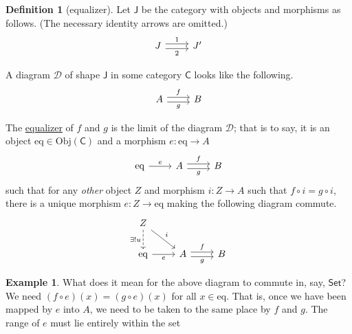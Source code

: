 \documentclass[a4paper,10pt]{scrreprt}
\newcommand{\defn}[1]{\ul{#1}}
\newcommand{\Obj}{\mathrm{Obj}}
\theoremstyle{definition}
\newtheorem{definition}{Definition}[section]
\newtheorem{example}{Example}[section]
\theoremstyle{plain}
\theoremstyle{remark}
\begin{document}
\begin{definition}[equalizer]
  \label{def:equalizer}
  Let $\mathsf{J}$ be the category with objects and morphisms as follows. (The necessary identity arrows are omitted.)
  \begin{equation*}
    \begin{tikzcd}
      J
      \arrow[r, shift left, "1"]
      \arrow[r, shift right, swap, "2"]
      & J'
    \end{tikzcd}
  \end{equation*}

  A diagram $\mathcal{D}$ of shape $\mathsf{J}$ in some category $\mathsf{C}$ looks like the following.
  \begin{equation*}
    \begin{tikzcd}
      A 
      \arrow[r, shift left, "f"]
      \arrow[r, shift right, swap, "g"]
      & B
    \end{tikzcd}
  \end{equation*}

  The \defn{equalizer} of $f$ and $g$ is the limit of the diagram $\mathcal{D}$; that is to say, it is an object $\mathrm{eq} \in \Obj(\mathsf{C})$ and a morphism $e\colon \mathrm{eq} \to A$
  \begin{equation*}
    \begin{tikzcd}
      \mathrm{eq}
      \arrow[r, "e"]
      & A
      \arrow[r, shift left, "f"]
      \arrow[r, shift right, swap, "g"]
      & B
    \end{tikzcd}
  \end{equation*}
  such that for any \emph{other} object $Z$ and morphism $i\colon Z \to A$ such that $f \circ i = g \circ i$, there is a unique morphism $e\colon Z \to \mathrm{eq}$ making the following diagram commute.
  \begin{equation*}
    \begin{tikzcd}
      Z 
      \arrow[d, swap, dashed, "\exists! u"]
      \arrow[dr, "i"]
      \\
      \mathrm{eq}
      \arrow[r, swap, "e"]
      & A
      \arrow[r, shift left, "f"]
      \arrow[r, shift right, swap, "g"]
      & B
    \end{tikzcd}
  \end{equation*}
\end{definition}
\begin{example}
  What does it mean for the above diagram to commute in, say, $\mathsf{Set}$? We need $(f \circ e)(x) = (g \circ e)(x)$ for all $x \in \mathrm{eq}$. That is, once we have been mapped by $e$ into $A$, we need to be taken to the same place by $f$ and $g$. The range of $e$ must lie entirely within the set 
\end{example}
\end{document}
